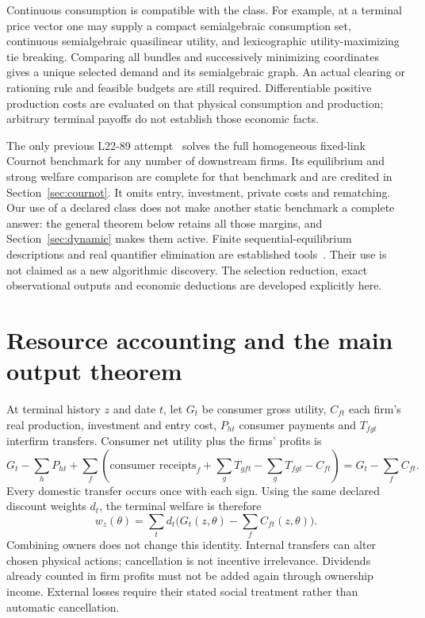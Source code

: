 \documentclass[11pt,a4paper]{article}
\numberwithin{equation}{section}
\theoremstyle{definition}
\begin{document}
Continuous consumption is compatible with the class. For example, at a
terminal price vector one may supply a compact semialgebraic consumption set,
continuous semialgebraic quasilinear utility, and lexicographic utility-maximizing
tie breaking. Comparing all bundles and successively minimizing coordinates
gives a unique selected demand and its semialgebraic graph. An actual clearing
or rationing rule and feasible budgets are still required. Differentiable
positive production costs are evaluated on that physical consumption and
production; arbitrary terminal payoffs do not establish those economic facts.

The only previous L22-89 attempt~\cite{prior} solves the full homogeneous
fixed-link Cournot benchmark for any number of downstream firms. Its
equilibrium and strong welfare comparison are complete for that benchmark
and are credited in Section~\ref{sec:cournot}. It omits entry, investment,
private costs and rematching. Our use of a declared class does not make
another static benchmark a complete answer: the general theorem below
retains all those margins, and Section~\ref{sec:dynamic} makes them active.
Finite sequential-equilibrium descriptions and real quantifier elimination
are established tools~\cite{Graf,Basu}. Their use is not claimed as a new
algorithmic discovery. The selection reduction, exact observational outputs
and economic deductions are developed explicitly here.

\section{Resource accounting and the main output theorem}\label{sec:main}

At terminal history $z$ and date $t$, let $G_t$ be consumer gross utility,
$C_{ft}$ each firm's real production, investment and entry cost, $P_{ht}$
consumer payments and $T_{fgt}$ interfirm transfers. Consumer net utility
plus the firms' profits is
\[
 G_t-\sum_hP_{ht}
 +\sum_f\left(\text{consumer receipts}_f
            +\sum_g T_{gft}-\sum_gT_{fgt}-C_{ft}\right)
 =G_t-\sum_f C_{ft}.
\]
Every domestic transfer occurs once with each sign. Using the same declared
discount weights $d_t$, the terminal welfare is therefore
\begin{equation}\label{eq:welfare}
 w_z(\theta)=\sum_t d_t\bigl(G_t(z,\theta)-\sum_f C_{ft}(z,\theta)\bigr).
\end{equation}
Combining owners does not change this identity. Internal transfers can alter
chosen physical actions; cancellation is not incentive irrelevance. Dividends
already counted in firm profits must not be added again through ownership
income. External losses require their stated social treatment rather than
automatic cancellation.
\end{document}
